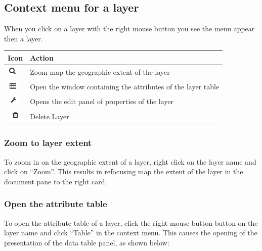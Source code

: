 \documentclass[letterpaper,10pt,english]{sphinxmanual}
\begin{document}
\subsection{Context menu for a layer}
\label{maps/layerstree:menu-contextuel-d-une-couche}
When you click on a layer with the right mouse button you see the menu appear then a layer.

\begin{tabulary}{\linewidth}{|L|L|}
\hline

\textbf{Icon}
 & 
\textbf{Action}
\\
\hline
\includegraphics{search.png}
 & 
Zoom map the geographic extent of the layer
\\
\hline
\includegraphics{table1.png}
 & 
Open the window containing the attributes of the layer table
\\
\hline
\includegraphics{configuration1.png}
 & 
Opens the edit panel of properties of the layer
\\
\hline
\includegraphics{delete3.png}
 & 
Delete Layer
\\
\hline\end{tabulary}



\subsubsection{Zoom to layer extent}
\label{maps/layerstree:zoomer-sur-l-etendue-d-une-couche}
To zoom in on the geographic extent of a layer, right click on the layer name and click on ``Zoom''. This results in refocusing map the extent of the layer in the document pane to the right card.


\subsubsection{Open the attribute table}
\label{maps/layerstree:ouvrir-la-table-d-attributs}
To open the attribute table of a layer, click the right mouse button button on the layer name and click ``Table'' in the context menu. This causes the opening of the presentation of the data table panel, as shown below:
\end{document}
